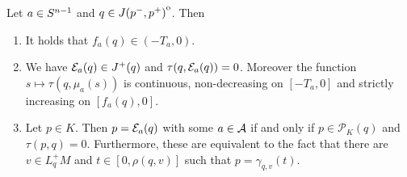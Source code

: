 \begin{lemma}\label{lem:observationtime}
Let $a\in {S^{n-1}}$ and $q \in {\kern0ptJ(p^-,p^+)}^{\mathrm{o}}$. Then
\begin{enumerate}[label={\textnormal{(\arabic*)}}]
    \item It holds that $f_a(q)\in (-T_a,0)$.
    \item We have ${\mathcal{E}}_a(q)\in J^+(q)$ and $\tau(q,{\mathcal{E}}_a(q))=0$. Moreover the function $s\mapsto\tau(q,\mu_a(s))$ is continuous, non-decreasing on $[-T_a,0]$ and strictly increasing on $[f_a(q),0]$.
    \item Let $p\in K$. Then $p={\mathcal{E}}_a(q)$ with some $a\in \mathcal{A}$ if and only if $p\in \mathcal{P}_K(q)$ and $\tau(p,q)=0$. Furthermore, these are equivalent to the fact that there are $v\in L^+_qM$ and $t\in[0,\rho(q,v)]$ such that $p=\gamma_{q,v}(t)$.
\end{enumerate}
\end{lemma}
